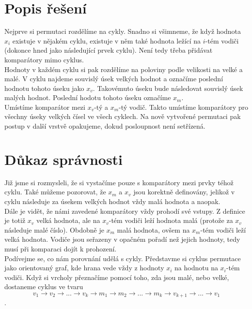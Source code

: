 \documentclass{scrartcl}
\begin{document}
\section{Popis řešení}
Nejprve si permutaci rozdělíme na cykly. Snadno si všimneme, že když hodnota $x_i$ existuje v nějakém cyklu, existuje v něm také hodnota ležící na $i$-tém vodiči (dokonce hned jako následující prvek cyklu). Není tedy třeba přidávat komparátory mimo cyklus. \\

Hodnoty v každém cyklu si pak rozdělíme na poloviny podle velikosti na velké a malé. V cyklu najdeme souvislý úsek velkých hodnot a označíme poslední hodnotu tohoto úseku jako $x_v$. Takovémuto úseku bude následovat souvislý úsek malých hodnot. Poslední hodotu tohoto úseku označíme $x_m$.\\

Umístíme komparátor mezi $x_v$-tý a $x_m$-tý vodič. Takto umístíme komparátory pro všechny úseky velkých čísel ve všech cyklech. Na nově vytvořené permutaci pak postup v další vrstvě opakujeme, dokud posloupnost není setřízená.

\section{Důkaz správnosti}
Již jsme si rozmysleli, že si vystačíme pouze s komparátory mezi prvky téhož cyklu. Také můžeme pozorovat, že $x_m$ a $x_v$ jsou korektně definovány, jelikož v cyklu následuje za úsekem velkých hodnot vždy malá hodnota a naopak. \\

Dále je vidět, že námi zavedené komparátory vždy prohodí své vstupy. Z definice je totiž $x_v$ velká hodnota, ale na $x_v$-tém vodiči leží hodnota malá (protože za $x_v$ následuje malé číslo). Obdobně je $x_m$ malá hodnota, ovšem na $x_m$-tém vodiči leží velká hodnota. Vodiče jsou seřazeny v opačném pořadí než jejich hodnoty, tedy musí při komparaci dojít k prohození.\\

Podívejme se, co nám porovnání udělá s cykly. Představme si cyklus permutace jako orientovaný graf, kde hrana vede vždy z hodnoty $x_i$ na hodnotu na $x_i$-tém vodiči. Když si vrcholy přeznačíme pomocí toho, zda jsou malé, nebo velké, dostaneme cyklus ve tvaru $$v_1\rightarrow v_2\rightarrow ...\rightarrow v_k\rightarrow m_1\rightarrow m_2\rightarrow ...\rightarrow m_k\rightarrow v_{k+1}\rightarrow ...\rightarrow v_1$$.\\
\end{document}

